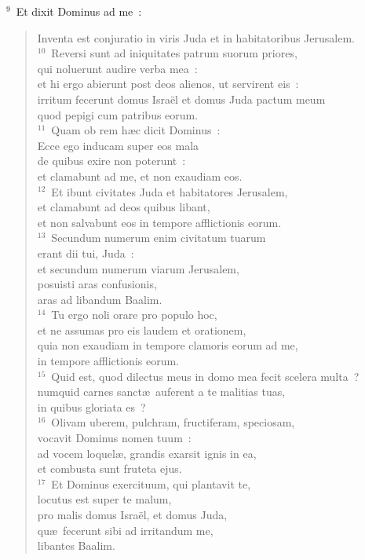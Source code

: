 ${}^{9}$~Et dixit Dominus ad me~: \begin{verse}Inventa est conjuratio in viris Juda et in habitatoribus Jerusalem.\\
${}^{10}$~Reversi sunt ad iniquitates patrum suorum priores,\\ qui noluerunt audire verba mea~:\\ et hi ergo abierunt post deos alienos, ut servirent eis~:\\ irritum fecerunt domus Isra\"el et domus Juda pactum meum\\ quod pepigi cum patribus eorum.\\
${}^{11}$~Quam ob rem h\ae c dicit Dominus~:\\ Ecce ego inducam super eos mala\\ de quibus exire non poterunt~:\\ et clamabunt ad me, et non exaudiam eos.\\
${}^{12}$~Et ibunt civitates Juda et habitatores Jerusalem,\\ et clamabunt ad deos quibus libant,\\ et non salvabunt eos in tempore afflictionis eorum.\\
${}^{13}$~Secundum numerum enim civitatum tuarum\\ erant dii tui, Juda~:\\ et secundum numerum viarum Jerusalem,\\ posuisti aras confusionis,\\ aras ad libandum Baalim.\\
${}^{14}$~Tu ergo noli orare pro populo hoc,\\ et ne assumas pro eis laudem et orationem,\\ quia non exaudiam in tempore clamoris eorum ad me,\\ in tempore afflictionis eorum.\\
${}^{15}$~Quid est, quod dilectus meus in domo mea fecit scelera multa~?\\ numquid carnes sanct\ae\ auferent a te malitias tuas,\\ in quibus gloriata es~?\\
${}^{16}$~Olivam uberem, pulchram, fructiferam, speciosam,\\ vocavit Dominus nomen tuum~:\\ ad vocem loquel\ae , grandis exarsit ignis in ea,\\ et combusta sunt fruteta ejus.\\
${}^{17}$~Et Dominus exercituum, qui plantavit te,\\ locutus est super te malum,\\ pro malis domus Isra\"el, et domus Juda,\\ qu\ae\ fecerunt sibi ad irritandum me,\\ libantes Baalim.\end{verse}


